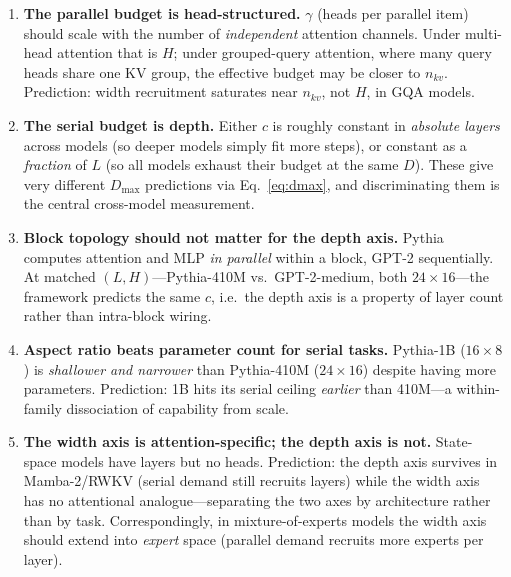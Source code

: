 \documentclass[11pt]{article}
\begin{document}
\begin{enumerate}[leftmargin=1.9em,itemsep=3pt,label=\textbf{A\arabic*.}]
\item \textbf{The parallel budget is head-structured.} $\gamma$ (heads per
parallel item) should scale with the number of \emph{independent} attention
channels. Under multi-head attention that is $H$; under grouped-query
attention, where many query heads share one KV group, the effective budget may
be closer to $n_{kv}$. Prediction: width recruitment saturates near $n_{kv}$,
not $H$, in GQA models.
\item \textbf{The serial budget is depth.} Either $c$ is roughly constant in
\emph{absolute layers} across models (so deeper models simply fit more steps),
or constant as a \emph{fraction} of $L$ (so all models exhaust their budget at
the same $D$). These give very different $D_{\max}$ predictions via
Eq.~\eqref{eq:dmax}, and discriminating them is the central cross-model
measurement.
\item \textbf{Block topology should not matter for the depth axis.} Pythia
computes attention and MLP \emph{in parallel} within a block, GPT-2
sequentially. At matched $(L,H)$---Pythia-410M vs.\ GPT-2-medium, both
$24{\times}16$---the framework predicts the same $c$, i.e.\ the depth axis is a
property of layer count rather than intra-block wiring.
\item \textbf{Aspect ratio beats parameter count for serial tasks.} Pythia-1B
($16{\times}8$) is \emph{shallower and narrower} than Pythia-410M
($24{\times}16$) despite having more parameters. Prediction: 1B hits its serial
ceiling \emph{earlier} than 410M---a within-family dissociation of capability
from scale.
\item \textbf{The width axis is attention-specific; the depth axis is not.}
State-space models have layers but no heads. Prediction: the depth axis
survives in Mamba-2/RWKV (serial demand still recruits layers) while the width
axis has no attentional analogue---separating the two axes by architecture
rather than by task. Correspondingly, in mixture-of-experts models the width
axis should extend into \emph{expert} space (parallel demand recruits more
experts per layer).
\end{enumerate}
\end{document}
